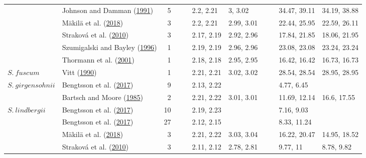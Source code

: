 \documentclass[
  12pt,
]{article}
\begin{document}
\begin{table}[H]
{\begin{tabular}[t]{llrllllllll}
 & Johnson and Damman (\protect\hyperlink{ref-Johnson.1991}{1991}) & 5 &  &  & 2.2, 2.21 & 3, 3.02 &  &  & 34.47, 39.11 & 34.19, 38.88\\

 & Mäkilä et al. (\protect\hyperlink{ref-Makila.2018}{2018}) & 3 &  &  & 2.2, 2.21 & 2.99, 3.01 &  &  & 22.44, 25.95 & 22.59, 26.11\\

 & Straková et al. (\protect\hyperlink{ref-Strakova.2010}{2010}) & 3 &  &  & 2.17, 2.19 & 2.92, 2.96 &  &  & 17.84, 21.85 & 18.06, 21.95\\

 & Szumigalski and Bayley (\protect\hyperlink{ref-Szumigalski.1996}{1996}) & 1 &  &  & 2.19, 2.19 & 2.96, 2.96 &  &  & 23.08, 23.08 & 23.24, 23.24\\

 & Thormann et al. (\protect\hyperlink{ref-Thormann.2001}{2001}) & 1 &  &  & 2.18, 2.18 & 2.95, 2.95 &  &  & 16.42, 16.42 & 16.73, 16.73\\

\multirow[t]{-10}{*}{\raggedright\arraybackslash $S.~fuscum$} & Vitt (\protect\hyperlink{ref-Vitt.1990}{1990}) & 1 &  &  & 2.21, 2.21 & 3.02, 3.02 &  &  & 28.54, 28.54 & 28.95, 28.95\\
\cmidrule{1-11}
$S.~girgensohnii$ & Bengtsson et al. (\protect\hyperlink{ref-Bengtsson.2017}{2017}) & 9 &  &  & 2.13, 2.22 &  &  &  & 4.77, 6.45 & \\
\cmidrule{1-11}
 & Bartsch and Moore (\protect\hyperlink{ref-Bartsch.1985}{1985}) & 2 &  &  & 2.21, 2.22 & 3.01, 3.01 &  &  & 11.69, 12.14 & 16.6, 17.55\\

\multirow[t]{-2}{*}{\raggedright\arraybackslash $S.~lindbergii$} & Bengtsson et al. (\protect\hyperlink{ref-Bengtsson.2017}{2017}) & 10 &  &  & 2.19, 2.23 &  &  &  & 7.16, 9.03 & \\
\cmidrule{1-11}
 & Bengtsson et al. (\protect\hyperlink{ref-Bengtsson.2017}{2017}) & 27 &  &  & 2.12, 2.15 &  &  &  & 8.33, 11.24 & \\

 & Mäkilä et al. (\protect\hyperlink{ref-Makila.2018}{2018}) & 3 &  &  & 2.21, 2.22 & 3.03, 3.04 &  &  & 16.22, 20.47 & 14.95, 18.52\\

 & Straková et al. (\protect\hyperlink{ref-Strakova.2010}{2010}) & 3 &  &  & 2.11, 2.12 & 2.78, 2.81 &  &  & 9.77, 11 & 8.78, 9.82\\


\end{tabular}}
\end{table}
\end{document}
